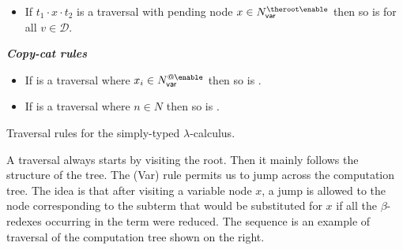 \begin{FramedTable}
\begin{itemize}[]
\item {} If $t_1
\cdot x \cdot t_2$ is a traversal with pending node $x \in
N_{\sf var}^{\theroot\enable}$ then so is  for all $v \in
\mathcal{D}$.
\end{itemize}

\emph{\bf Copy-cat rules}
\begin{itemize}[]
\item{}
If  is a traversal where $x_i \in
    N_{\sf var}^{@\enable}$ then so is .

\item{}
  If  is a traversal where $n\in N$ then so is
.
\end{itemize}
\caption[Traversal rules for the simply-typed
lambda calculus]{Traversal rules for the simply-typed
$\lambda$-calculus.} \label{tab:trav_rules}
\end{FramedTable}

 A traversal always starts by visiting the root. Then it mainly
follows the structure of the tree. The (Var) rule permits us to jump
across the computation tree. The idea is that after visiting a
variable node $x$, a jump is allowed to the node corresponding to
the subterm that would be substituted for $x$ if all the
$\beta$-redexes occurring in the term were reduced. The sequence
 is an example of traversal of the computation tree shown on the right.

